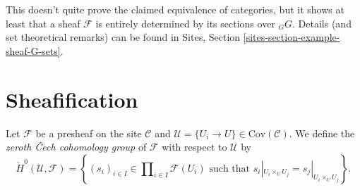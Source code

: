 This doesn't quite prove the claimed equivalence of categories, but it shows at
least that a sheaf $\mathcal{F}$ is entirely determined by its sections over
${}_G G$. Details (and set theoretical remarks) can be found in
Sites, Section \ref{sites-section-example-sheaf-G-sets}.




\section{Sheafification}
\label{section-sheafification}

\begin{definition}
\label{definition-0-cech}
Let $\mathcal{F}$ be a presheaf on the site $\mathcal{C}$ and
$\mathcal{U} = \{U_i \to U\} \in \text{Cov} (\mathcal{C})$.
We define the {\it zeroth {\v C}ech cohomology group} of
$\mathcal{F}$ with respect to $\mathcal{U}$ by
$$
\check H^0 (\mathcal{U}, \mathcal{F}) =
\left\{
(s_i)_{i\in I} \in \prod\nolimits_{i\in I }\mathcal{F}(U_i)
\text{ such that }
s_i|_{U_i \times_U U_j} = s_j |_{U_i \times_U U_j}
\right\}.
$$
\end{definition}


